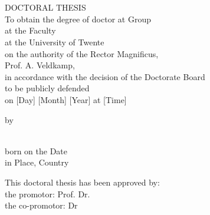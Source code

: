 \begin{titlepage}
 \ifprintcover
	\thispagestyle{empty}
	
	\cleardoublepage  
 \fi
\thispagestyle{empty}
\center
\vspace*{1cm}

\textbf{\Huge{\MakeUppercase\myTitle}}\\
\vspace{0.5cm}
\Large{\MakeUppercase\mySubTitle}

\vspace{3cm}

\textbf{\myAuthorName}
\vfill

\cleardoublepage


\thispagestyle{empty}
\center

\textbf{\huge{\MakeUppercase\myTitle}}\\
\vspace{0.5cm}
\Large{\MakeUppercase\mySubTitle}

\vfill

\Large{DOCTORAL THESIS}\\

\vfill
\normalsize
	To obtain the degree of doctor at Group\\at the Faculty \\ at the University of Twente\\
	on the authority of the Rector Magnificus,\\
	Prof. A. Veldkamp,\\
	in accordance with the decision of the Doctorate Board\\
	to be publicly defended\\
	on [Day] [Month] [Year] at [Time]
        
\vfill

by

\vfill

\textbf{\large{\myAuthorName}}\\[2\baselineskip]

born on the Date\\
in Place, Country


\clearpage
\thispagestyle{empty}
\raggedright
This doctoral thesis has been approved by:\\[2\baselineskip]
the promotor: Prof. Dr. \\
the co-promotor: Dr \\

\vfill


\end{titlepage}
